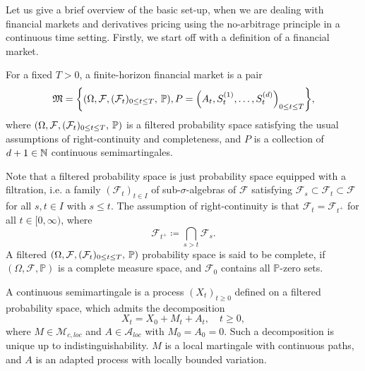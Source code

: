 Let us give a brief overview of the basic set-up, when we are dealing with financial markets and derivatives pricing using the no-arbitrage principle in a continuous time setting. Firstly, we start off with a definition of a financial market.
\begin{defn}
    For a fixed $T>0$, a finite-horizon financial market is a pair
    \begin{equation}
        \mathfrak{M}=\left\{\left(\Omega,\mathcal{F},(\mathcal{F}_{t})_{0\leq t\leq T},\hspace{2 pt}\mathbb{P}\right), P=\left(A_{t},S_{t}^{(1)},\dots,S_{t}^{(d)}\right)_{0\leq t\leq T}\right\},
    \end{equation}
    where $(\Omega,\mathcal{F},(\mathcal{F}_{t})_{0\leq t\leq T},\hspace{2 pt}\mathbb{P})$ is a filtered probability space satisfying the usual assumptions of right-continuity and completeness, and $P$ is a collection of $d+1\in\mathbb{N}$ continuous semimartingales.
\end{defn}
Note that a filtered probability space is just probability space equipped with a filtration, i.e. a family $\left(\mathcal{F}_{t}\right)_{t\in I}$ of sub-$\sigma$-algebras of $\mathcal{F}$ satisfying $\mathcal{F}_{s}\subset \mathcal{F}_{t}\subset\mathcal{F}$ for all $s,t\in I$ with $s\leq t$. The assumption of right-continuity is that $\mathcal{F}_{t}=\mathcal{F}_{t^{+}}$ for all $t\in [0,\infty)$, where
\begin{equation}
    \mathcal{F}_{t^{+}}\coloneqq\bigcap_{s>t}\mathcal{F}_{s}.
\end{equation}
A filtered $(\Omega,\mathcal{F},(\mathcal{F}_{t})_{0\leq t\leq T},\hspace{2 pt}\mathbb{P})$ probability space is said to be complete, if $(\Omega,\mathcal{F},\mathbb{P})$ is a complete measure space, and $\mathcal{F}_{0}$ contains all $\mathbb{P}$-zero sets. 

A continuous semimartingale is a process $(X_{t})_{t\geq 0}$ defined on a filtered probability space, which admits the decomposition
\begin{equation}\label{decomp}
    X_{t}=X_{0}+M_{t}+A_{t},\quad t\geq 0,
\end{equation}
where $M\in \mathcal{M}_{c,loc}$ and $A\in \mathcal{A}_{loc}$ with $M_{0}=A_{0}=0$. Such a decomposition is unique up to indistinguishability. $M$ is a local martingale with continuous paths, and $A$ is an adapted process with locally bounded variation.

